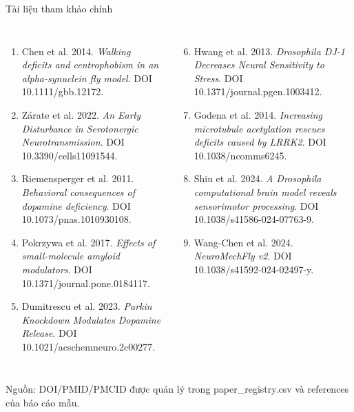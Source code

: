 \documentclass[10pt,aspectratio=169]{beamer}
\newcommand{\source}[1]{\par\vfill{\fontsize{6.0}{7}\selectfont\color{gray}Nguồn: #1\par}}
\begin{document}
\begin{frame}{Tài liệu tham khảo chính}
\small
\begin{columns}[T,onlytextwidth]
\begin{enumerate}\setlength\itemsep{5pt}
\item Chen et al. 2014. \textit{Walking deficits and centrophobism in an alpha-synuclein fly model}. DOI 10.1111/gbb.12172.
\item Zárate et al. 2022. \textit{An Early Disturbance in Serotonergic Neurotransmission}. DOI 10.3390/cells11091544.
\item Riemensperger et al. 2011. \textit{Behavioral consequences of dopamine deficiency}. DOI 10.1073/pnas.1010930108.
\item Pokrzywa et al. 2017. \textit{Effects of small-molecule amyloid modulators}. DOI 10.1371/journal.pone.0184117.
\item Dumitrescu et al. 2023. \textit{Parkin Knockdown Modulates Dopamine Release}. DOI 10.1021/acschemneuro.2c00277.
\end{enumerate}
\begin{enumerate}\setcounter{enumi}{5}\setlength\itemsep{5pt}
\item Hwang et al. 2013. \textit{Drosophila DJ-1 Decreases Neural Sensitivity to Stress}. DOI 10.1371/journal.pgen.1003412.
\item Godena et al. 2014. \textit{Increasing microtubule acetylation rescues deficits caused by LRRK2}. DOI 10.1038/ncomms6245.
\item Shiu et al. 2024. \textit{A Drosophila computational brain model reveals sensorimotor processing}. DOI 10.1038/s41586-024-07763-9.
\item Wang-Chen et al. 2024. \textit{NeuroMechFly v2}. DOI 10.1038/s41592-024-02497-y.
\end{enumerate}
\end{columns}
\source{DOI/PMID/PMCID được quản lý trong paper\_registry.csv và references của báo cáo mẫu.}
\end{frame}
\end{document}
